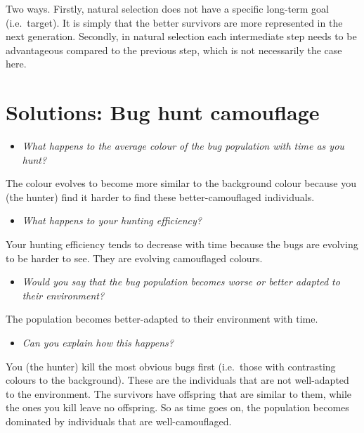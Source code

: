 \documentclass[
  a4paper]{book}
\providecommand{\tightlist}{%
  \setlength{\itemsep}{0pt}\setlength{\parskip}{0pt}}
\begin{document}
Two ways. Firstly, natural selection does not have a specific long-term goal (i.e.~target). It is simply that the better survivors are more represented in the next generation. Secondly, in natural selection each intermediate step needs to be advantageous compared to the previous step, which is not necessarily the case here.

\section{Solutions: Bug hunt camouflage}\label{solutions-bug-hunt-camouflage}

\begin{itemize}
\tightlist
\item
  \emph{What happens to the average colour of the bug population with time as you hunt?}
\end{itemize}

The colour evolves to become more similar to the background colour because you (the hunter) find it harder to find these better-camouflaged individuals.

\begin{itemize}
\tightlist
\item
  \emph{What happens to your hunting efficiency?}
\end{itemize}

Your hunting efficiency tends to decrease with time because the bugs are evolving to be harder to see. They are evolving camouflaged colours.

\begin{itemize}
\tightlist
\item
  \emph{Would you say that the bug population becomes worse or better adapted to their environment?}
\end{itemize}

The population becomes better-adapted to their environment with time.

\begin{itemize}
\tightlist
\item
  \emph{Can you explain how this happens?}
\end{itemize}

You (the hunter) kill the most obvious bugs first (i.e.~those with contrasting colours to the background). These are the individuals that are not well-adapted to the environment. The survivors have offspring that are similar to them, while the ones you kill leave no offspring. So as time goes on, the population becomes dominated by individuals that are well-camouflaged.
\end{document}
